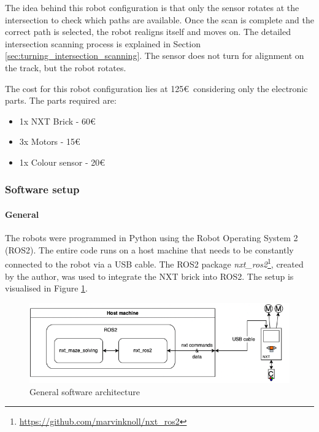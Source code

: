 The idea behind this robot configuration is that only the sensor rotates at the intersection 
to check which paths are available. Once the scan is complete and the correct path is selected, the robot realigns itself and moves on. The detailed intersection scanning process is explained in Section \ref{sec:turning_intersection_scanning}.
The sensor does not turn for alignment on the track, but the robot rotates.

The cost for this robot configuration lies at 125\euro\ considering only the electronic parts. The parts required are:
\begin{itemize}
    \item 1x NXT Brick - 60\euro
    \item 3x Motors - 15\euro
    \item 1x Colour sensor - 20\euro
\end{itemize}

\subsubsection{Software setup}
\paragraph{General} \label{sec:software_setup_general}

The robots were programmed in Python using the Robot Operating System 2 (ROS2). The entire code runs on a host machine that needs to be constantly connected to the robot via a USB cable. The ROS2 package \textit{nxt\_ros2}\footnote{\label{fot:nxt_ros}\url{https://github.com/marvinknoll/nxt\_ros2}}, created by the author, was used to integrate the NXT brick into ROS2. The setup is visualised in Figure \ref{fig:sw_architecture}.

\begin{figure}[h]
    \centering
    \includegraphics[width=\textwidth]{resources/architecture.png}
    \caption{General software architecture}
    \label{fig:sw_architecture}
\end{figure}

